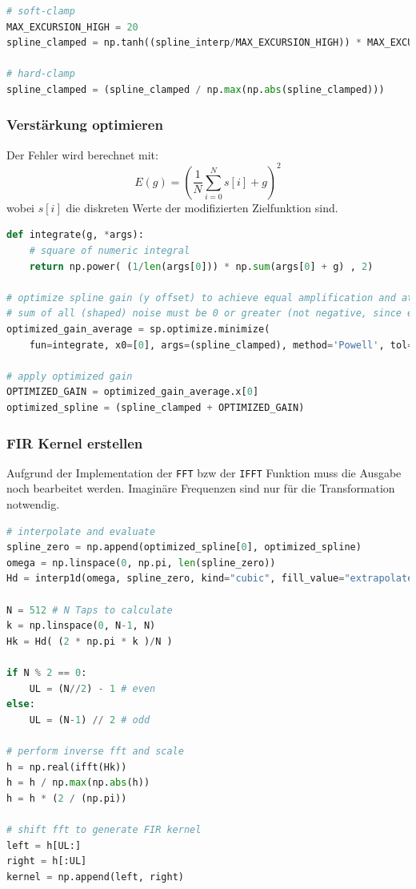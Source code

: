 \begin{lstlisting}[language=Python]
# soft-clamp
MAX_EXCURSION_HIGH = 20
spline_clamped = np.tanh((spline_interp/MAX_EXCURSION_HIGH)) * MAX_EXCURSION_HIGH

# hard-clamp
spline_clamped = (spline_clamped / np.max(np.abs(spline_clamped)))
\end{lstlisting}

\hypertarget{verstuxe4rkung-optimieren}{%
\subsubsection{Verstärkung optimieren}\label{verstuxe4rkung-optimieren}}

Der Fehler wird berechnet mit: \[
E(g) = \left( \frac{1}{N} \sum_{i=0}^{N} s[i] + g \right)^2
\] wobei \(s[i]\) die diskreten Werte der modifizierten Zielfunktion
sind.

\begin{lstlisting}[language=Python]
def integrate(g, *args):
    # square of numeric integral
    return np.power( (1/len(args[0])) * np.sum(args[0] + g) , 2)

# optimize spline gain (y offset) to achieve equal amplification and attenuation
# sum of all (shaped) noise must be 0 or greater (not negative, since energy musnt be lost)
optimized_gain_average = sp.optimize.minimize(
    fun=integrate, x0=[0], args=(spline_clamped), method='Powell', tol=1e-16, options={'disp': False})

# apply optimized gain
OPTIMIZED_GAIN = optimized_gain_average.x[0]
optimized_spline = (spline_clamped + OPTIMIZED_GAIN)
\end{lstlisting}

\hypertarget{fir-kernel-erstellen}{%
\subsubsection{FIR Kernel erstellen}\label{fir-kernel-erstellen}}

Aufgrund der Implementation der \texttt{FFT} bzw der \texttt{IFFT}
Funktion muss die Ausgabe noch bearbeitet werden. Imaginäre Frequenzen
sind nur für die Transformation notwendig.

\begin{lstlisting}[language=Python]
# interpolate and evaluate
spline_zero = np.append(optimized_spline[0], optimized_spline)
omega = np.linspace(0, np.pi, len(spline_zero))
Hd = interp1d(omega, spline_zero, kind="cubic", fill_value="extrapolate", bounds_error=False)

N = 512 # N Taps to calculate
k = np.linspace(0, N-1, N)
Hk = Hd( (2 * np.pi * k )/N )

if N % 2 == 0:
    UL = (N//2) - 1 # even
else:
    UL = (N-1) // 2 # odd

# perform inverse fft and scale
h = np.real(ifft(Hk))
h = h / np.max(np.abs(h))
h = h * (2 / (np.pi))

# shift fft to generate FIR kernel
left = h[UL:]
right = h[:UL]
kernel = np.append(left, right)
\end{lstlisting}

